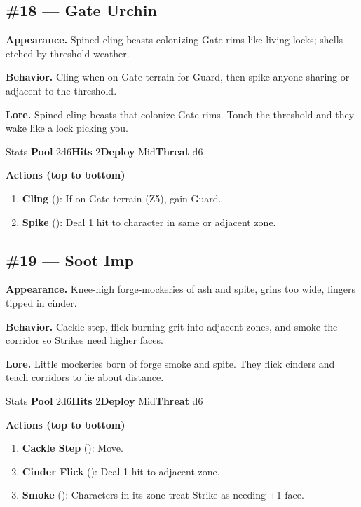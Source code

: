 \subsection*{\#18 --- Gate Urchin}

\textbf{Appearance.} Spined cling-beasts colonizing Gate rims like living locks; shells etched by threshold weather.

\textbf{Behavior.} Cling when on Gate terrain for Guard, then spike anyone sharing or adjacent to the threshold.

\textbf{Lore.} Spined cling-beasts that colonize Gate rims. Touch the threshold and they wake like a lock picking you.

\begin{monsterentry}{Stats}
\textbf{Pool} 2d6\quad\textbf{Hits} 2\quad\textbf{Deploy} Mid\quad\textbf{Threat} d6

\textbf{Actions (top to bottom)}
\begin{enumerate}\setlength{\itemsep}{0.15em}\setlength{\parskip}{0pt}
  \item \textbf{Cling} (\easy): If on Gate terrain (Z5), gain Guard.
  \item \textbf{Spike} (\medium): Deal 1 hit to character in same or adjacent zone.
\end{enumerate}
\end{monsterentry}

\subsection*{\#19 --- Soot Imp}

\textbf{Appearance.} Knee-high forge-mockeries of ash and spite, grins too wide, fingers tipped in cinder.

\textbf{Behavior.} Cackle-step, flick burning grit into adjacent zones, and smoke the corridor so Strikes need higher faces.

\textbf{Lore.} Little mockeries born of forge smoke and spite. They flick cinders and teach corridors to lie about distance.

\begin{monsterentry}{Stats}
\textbf{Pool} 2d6\quad\textbf{Hits} 2\quad\textbf{Deploy} Mid\quad\textbf{Threat} d6

\textbf{Actions (top to bottom)}
\begin{enumerate}\setlength{\itemsep}{0.15em}\setlength{\parskip}{0pt}
  \item \textbf{Cackle Step} (\easy): Move.
  \item \textbf{Cinder Flick} (\medium): Deal 1 hit to adjacent zone.
  \item \textbf{Smoke} (\hard): Characters in its zone treat Strike as needing +1 face.
\end{enumerate}
\end{monsterentry}

